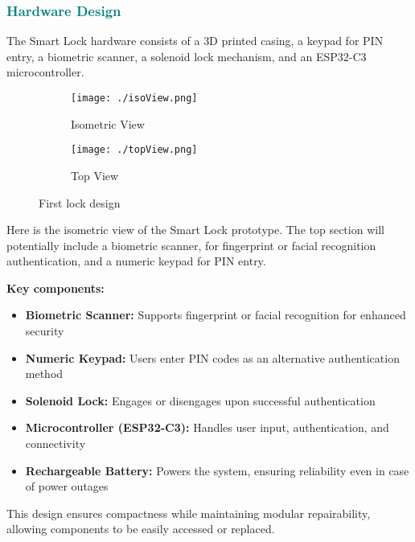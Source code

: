 \subsubsection{\textcolor{teal}{Hardware Design}}

The Smart Lock hardware consists of a 3D printed casing, a keypad for PIN entry, a biometric scanner, a solenoid lock mechanism, and an ESP32-C3 microcontroller.

\begin{figure}[htbp]
    \centering
    \begin{subfigure}[b]{0.48\textwidth}
        \texttt{[image: ./isoView.png]}
        \caption{Isometric View}
        \label{fig:isoView}
    \end{subfigure}
    \hfill
    \begin{subfigure}[b]{0.48\textwidth}
        \texttt{[image: ./topView.png]}
        \caption{Top View}
        \label{fig:topView}
    \end{subfigure}
    \caption{First lock design}
\end{figure}

Here is the isometric view of the Smart Lock prototype. The top section will potentially include a biometric scanner, for fingerprint or facial recognition authentication, and a numeric keypad for PIN entry.\newline

\textbf{Key components:}
\begin{itemize}
    \item \textbf{Biometric Scanner:} Supports fingerprint or facial recognition for enhanced security
    \item \textbf{Numeric Keypad:} Users enter PIN codes as an alternative authentication method
    \item \textbf{Solenoid Lock:} Engages or disengages upon successful authentication
    \item \textbf{Microcontroller (ESP32-C3):} Handles user input, authentication, and connectivity
    \item \textbf{Rechargeable Battery:} Powers the system, ensuring reliability even in case of power outages
\end{itemize}

This design ensures compactness while maintaining modular repairability, allowing components to be easily accessed or replaced.